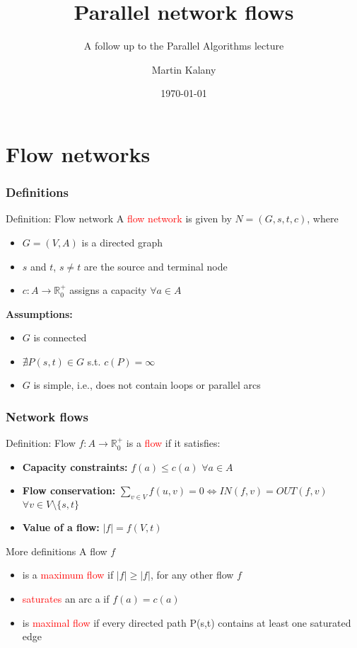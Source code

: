 \documentclass{beamer}
\title{Parallel network flows}
\subtitle{A follow up to the Parallel Algorithms lecture}
\author{Martin Kalany\inst{1} }
\institute
{
  \inst{1}
  Graduate student in Computer Science\\
  Vienna University of Technology\\
}
\date{\today}
\begin{document}

	\frame{\titlepage}
	
	\section{Flow networks}
 	\begin{frame}
	\frametitle{Definitions}
    \begin{block}{Definition: Flow network}
    A \textcolor{red}{flow network}\cite{Ahuja93} is given by $N = (G,s,t,c)$, where
    \begin{itemize}
    		\item $G =(V,A)$ is a directed graph
    		\item $s$ and $t$, $s \neq t$ are the source and terminal node
    		\item $c:A\rightarrow \mathbb{R}_0^{+}$ assigns a capacity $\forall a \in A$
    \end{itemize}
    \end{block}
    \textbf{Assumptions:}
	\begin{itemize}
		\item $G$ is connected
		\item $\nexists P(s,t) \in G$ s.t. $c(P) = \infty$
		\item $G$ is simple, i.e., does not contain loops or parallel arcs
	\end{itemize}
	\end{frame}
  
	\begin{frame}[shrink]
	\frametitle{Network flows}
	\begin{block}{Definition: Flow}
	$f:A \rightarrow \mathbb{R}_0^{+}$ is a \textcolor{red}{flow} if it satisfies:
	\begin{itemize}
		\item \textbf{Capacity constraints:} $f(a) \leq c(a)$ $\forall a \in A$
		\item \textbf{Flow conservation:} 
		$ \sum\limits_{v \in V} f(u,v) =  0 \Leftrightarrow IN(f,v) = OUT(f,v)$ $\forall v \in V \setminus \{s,t\}$
		\item \textbf{Value of a flow:} $\lvert f\rvert = f(V,t)$ 
	\end{itemize}
	\end{block}
	
	\begin{block}{More definitions }
	A flow $f$	
	\begin{itemize}
		\item is a \textcolor{red}{maximum flow} if $\lvert f\rvert \geq \lvert f\rvert$, for any other flow $f$
		\item \textcolor{red}{saturates} an arc a if $f(a) = c(a)$
		\item is \textcolor{red}{maximal flow} if every directed path P(s,t) contains at least one saturated edge
	\end{itemize}
	
	\end{block}
	\end{frame}
	
\end{document}
